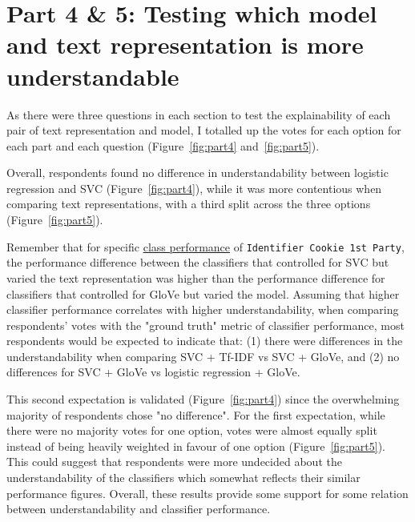 \section{Part 4 \& 5: Testing which model and text representation is more understandable}
\label{sec:testing_pairs}
As there were three questions in each section to test the explainability of each pair of text representation and model, I totalled up the votes for each option for each part and each question (Figure~\ref{fig:part4} and~\ref{fig:part5}).

Overall, respondents found no difference in understandability between logistic regression and SVC (Figure~\ref{fig:part4}), while it was more contentious when comparing text representations, with a third split across the three options (Figure~\ref{fig:part5}). 

Remember that for specific \hyperref[fig:heatmaps_perf]{class performance} of \texttt{Identifier Cookie 1st Party}, the performance difference between the classifiers that controlled for SVC but varied the text representation was higher than the performance difference for classifiers that controlled for GloVe but varied the model. Assuming that higher classifier performance correlates with higher understandability, when comparing respondents' votes with the "ground truth" metric of classifier performance, most respondents would be expected to indicate that: (1) there were differences in the understandability when comparing SVC + Tf-IDF vs SVC + GloVe, and (2) no differences for SVC + GloVe vs logistic regression + GloVe. 

This second expectation is validated (Figure~\ref{fig:part4}) since the overwhelming majority of respondents chose "no difference". For the first expectation, while there were no majority votes for one option, votes were almost equally split instead of being heavily weighted in favour of one option (Figure~\ref{fig:part5}). This could suggest that respondents were more undecided about the understandability of the classifiers which somewhat reflects their similar performance figures. Overall, these results provide some support for some relation between understandability and classifier performance.


